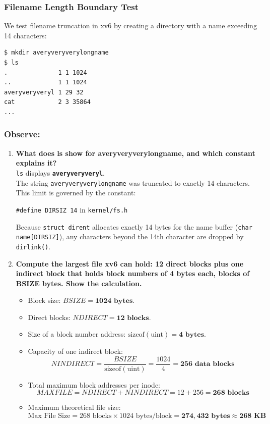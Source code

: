 \documentclass{labreport}
\begin{document}
\subsubsection{Filename Length Boundary Test}
We test filename truncation in xv6 by creating a directory with a name exceeding 14 characters:

\begin{lstlisting}[style=bash]
$ mkdir averyveryverylongname
$ ls
.              1 1 1024
..             1 1 1024
averyveryveryl 1 29 32
cat            2 3 35864
...
\end{lstlisting}

\subsubsection*{Observe:}
\begin{enumerate}[leftmargin=*]
    \item \textbf{What does ls show for averyveryverylongname, and which constant explains it?}\\[0.2em]
    \texttt{ls} displays \textbf{\texttt{averyveryveryl}}.\\
    The string \texttt{averyveryverylongname} was truncated to exactly 14 characters. This limit is governed by the constant:
    \begin{center}
    \texttt{\#define DIRSIZ 14} \quad in \texttt{kernel/fs.h}
    \end{center}
    Because \texttt{struct dirent} allocates exactly 14 bytes for the name buffer (\texttt{char name[DIRSIZ]}), any characters beyond the 14th character are dropped by \texttt{dirlink()}.

    \item \textbf{Compute the largest file xv6 can hold: 12 direct blocks plus one indirect block that holds block numbers of 4 bytes each, blocks of BSIZE bytes. Show the calculation.}
    \begin{itemize}[noitemsep, topsep=2pt]
        \item Block size: $BSIZE = \mathbf{1024 \text{ bytes}}$.
        \item Direct blocks: $NDIRECT = \mathbf{12 \text{ blocks}}$.
        \item Size of a block number address: $\text{sizeof}(\text{uint}) = \mathbf{4 \text{ bytes}}$.
        \item Capacity of one indirect block:
        \[
        NINDIRECT = \frac{BSIZE}{\text{sizeof}(\text{uint})} = \frac{1024}{4} = \mathbf{256 \text{ data blocks}}
        \]
        \item Total maximum block addresses per inode:
        \[
        MAXFILE = NDIRECT + NINDIRECT = 12 + 256 = \mathbf{268 \text{ blocks}}
        \]
        \item Maximum theoretical file size:
        \[
        \text{Max File Size} = 268 \text{ blocks} \times 1024 \text{ bytes/block} = \mathbf{274,432 \text{ bytes}} \approx \mathbf{268 \text{ KB}}
        \]
    \end{itemize}


\end{enumerate}
\end{document}
